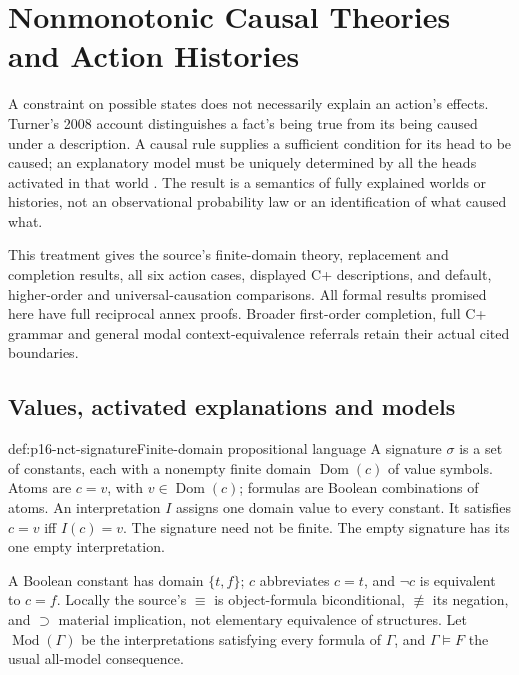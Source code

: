 \chapter{Nonmonotonic Causal Theories and Action Histories}
\label{sec:p16-nonmonotonic-causal-theories}

A constraint on possible states does not necessarily explain an action's
effects. Turner's 2008 account distinguishes a fact's being true from its
being caused under a description. A causal rule supplies a sufficient
condition for its head to be caused; an explanatory model must be uniquely
determined by all the heads activated in that world
\cite[pp.~759--776]{Turner2008NonmonotonicCausalLogic}.
The result is a semantics of fully explained worlds or histories, not an
observational probability law or an identification of what caused what.

This treatment gives the source's finite-domain theory, replacement and
completion results, all six action cases, displayed C+ descriptions, and
default, higher-order and universal-causation comparisons. All formal results
promised here have full reciprocal annex proofs. Broader first-order completion,
full C+ grammar and general modal context-equivalence referrals retain their
actual cited boundaries.

\section{Values, activated explanations and models}
\label{sec:p16-nct-semantics}

\begin{hbdefinition}{def:p16-nct-signature}{Finite-domain propositional language}
A signature \(\sigma\) is a set of constants, each with a nonempty finite
domain \(\operatorname{Dom}(c)\) of value symbols. Atoms are \(c=v\), with
\(v\in\operatorname{Dom}(c)\); formulas are Boolean combinations of atoms.
An interpretation \(I\) assigns one domain value to every constant.
It satisfies \(c=v\) iff \(I(c)=v\). The signature need not be finite.
The empty signature has its one empty interpretation.

A Boolean constant has domain \(\{t,f\}\); \(c\) abbreviates \(c=t\),
and \(\neg c\) is equivalent to \(c=f\).
Locally the source's \(\equiv\) is object-formula biconditional,
\(\not\equiv\) its negation, and \(\supset\) material implication, not
elementary equivalence of structures.
Let \(\operatorname{Mod}(\Gamma)\) be the interpretations satisfying every
formula of \(\Gamma\), and \(\Gamma\models F\) the usual all-model consequence.
\end{hbdefinition}

